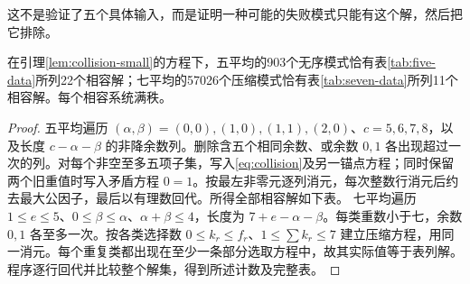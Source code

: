 这不是验证了五个具体输入，而是证明一种可能的失败模式只能有这个解，然后把它排除。
\begin{proposition}[碰撞分类证书]\label{prop:collision-certificate}
在引理\ref{lem:collision-small}的方程下，五平均的903个无序模式恰有表\ref{tab:five-data}所列22个相容解；七平均的57026个压缩模式恰有表\ref{tab:seven-data}所列11个相容解。每个相容系统满秩。
\end{proposition}
\begin{proof}
五平均遍历 $(\alpha,\beta)=(0,0),(1,0),(1,1),(2,0)$、$c=5,6,7,8$，以及长度 $c-\alpha-\beta$ 的非降余数列。删除含五个相同余数、或余数 $0,1$ 各出现超过一次的列。对每个非空至多五项子集，写入\eqref{eq:collision}及另一锚点方程；同时保留两个旧重值时写入矛盾方程 $0=1$。按最左非零元逐列消元，每次整数行消元后约去最大公因子，最后以有理数回代。所得全部相容解如下表。
七平均遍历 $1\le e\le5$、$0\le\beta\le\alpha$、$\alpha+\beta\le4$，长度为 $7+e-\alpha-\beta$。每类重数小于七，余数 $0,1$ 各至多一次。按各类选择数 $0\le k_r\le f_r$、$1\le\sum k_r\le7$ 建立压缩方程，用同一消元。每个重复类都出现在至少一条部分选取方程中，故其实际值等于表列解。程序逐行回代并比较整个解集，得到所述计数及完整表。
\end{proof}
\begingroup\small
